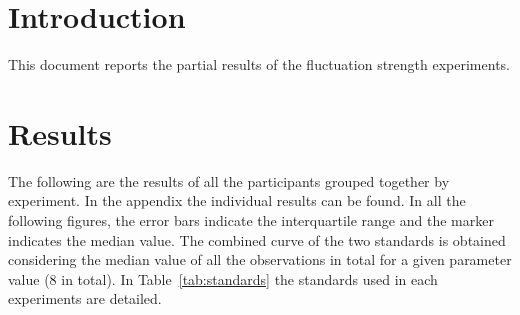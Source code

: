 \documentclass[a4paper]{article}
\begin{document}

\section{Introduction} %
\label{sec:introduction}

This document reports the partial results of the fluctuation strength
experiments.


\section{Results} %
\label{sec:results}

The following are the results of all the participants grouped together by
experiment. In the appendix the individual results can be found. In all the
following figures, the error bars indicate the interquartile range and the
marker indicates the median value. The combined curve of the two standards is
obtained considering the median value of all the observations in total for a
given parameter value (8 in total). In Table~\ref{tab:standards} the standards
used in each experiments are detailed.
\end{document}
